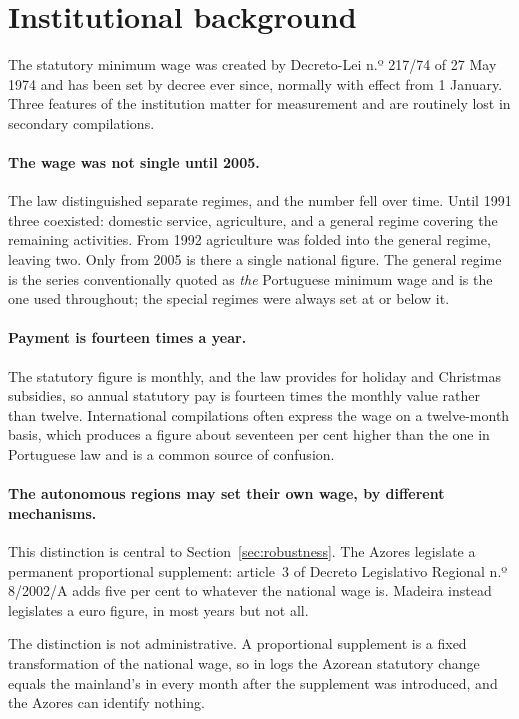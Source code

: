 \section{Institutional background}
\label{sec:institutions}

The statutory minimum wage was created by Decreto-Lei n.º 217/74 of 27 May 1974
and has been set by decree ever since, normally with effect from 1 January.
Three features of the institution matter for measurement and are routinely lost
in secondary compilations.

\paragraph{The wage was not single until 2005.} The law distinguished separate
regimes, and the number fell over time. Until 1991 three coexisted: domestic
service, agriculture, and a general regime covering the remaining activities.
From 1992 agriculture was folded into the general regime, leaving two. Only from
2005 is there a single national figure. The general regime is the series
conventionally quoted as \emph{the} Portuguese minimum wage and is the one used
throughout; the special regimes were always set at or below it.

\paragraph{Payment is fourteen times a year.} The statutory figure is monthly,
and the law provides for holiday and Christmas subsidies, so annual statutory
pay is fourteen times the monthly value rather than twelve. International
compilations often express the wage on a twelve-month basis, which produces a
figure about seventeen per cent higher than the one in Portuguese law and is a
common source of confusion.

\paragraph{The autonomous regions may set their own wage, by different
mechanisms.} This distinction is central to
Section~\ref{sec:robustness}. The Azores legislate a permanent proportional
supplement: article~3 of Decreto Legislativo Regional n.º 8/2002/A adds five per
cent to whatever the national wage is. Madeira instead legislates a euro figure,
in most years but not all.

The distinction is not administrative. A proportional supplement is a fixed
transformation of the national wage, so in logs the Azorean statutory change
equals the mainland's in every month after the supplement was introduced, and
the Azores can identify nothing.

